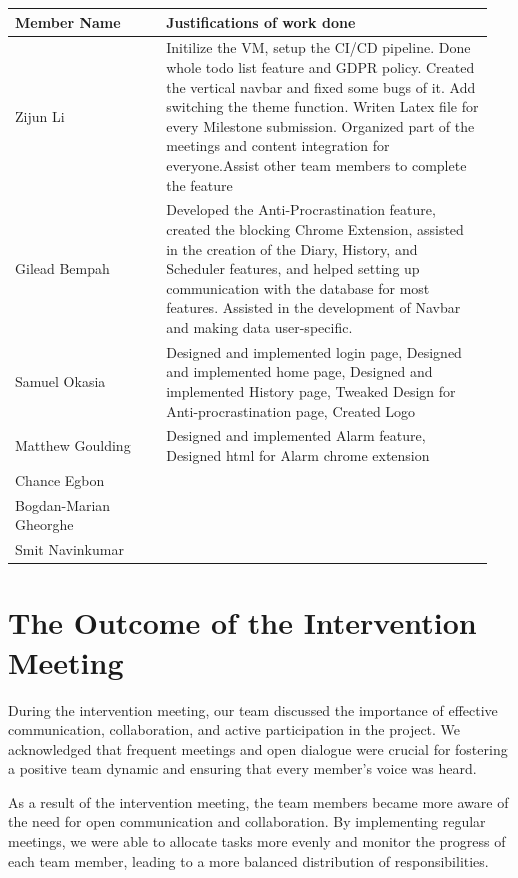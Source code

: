 \documentclass[a4paper]{article}
\begin{document}
{\noindent\begin{tabular}{|p{0.3\linewidth}|p{0.65\linewidth}|} 
	\hline
 \textbf{Member Name} & \textbf{Justifications of work done} \\
 \hline
 Zijun Li & Initilize the VM, setup the CI/CD pipeline. Done whole todo list feature and GDPR policy. Created the vertical navbar and fixed some bugs of it. Add switching the theme function. Writen Latex file for every Milestone submission. Organized part of the meetings and content integration for everyone.Assist other team members to complete the feature \\
 \hline
 Gilead Bempah & Developed the Anti-Procrastination feature, created the blocking Chrome Extension, assisted in the creation of the Diary, History, and Scheduler features, and helped setting up communication with the database for most features. Assisted in the development of Navbar and making data user-specific.\\
 \hline
 Samuel Okasia & Designed and implemented login page, Designed and implemented home page, Designed and implemented History page, Tweaked Design for Anti-procrastination page, Created Logo\\
 \hline
 Matthew Goulding& Designed and implemented Alarm feature, Designed html for Alarm chrome extension\\
 \hline
 Chance Egbon & \\
 \hline
 Bogdan-Marian Gheorghe & \\
 \hline
 Smit Navinkumar& \\
 \hline
\end{tabular}}

\newpage

\section*{The Outcome of the Intervention Meeting}

During the intervention meeting, our team discussed the importance of effective communication, collaboration, and active participation in the project. We acknowledged that frequent meetings and open dialogue were crucial for fostering a positive team dynamic and ensuring that every member's voice was heard.

As a result of the intervention meeting, the team members became more aware of the need for open communication and collaboration. By implementing regular meetings, we were able to allocate tasks more evenly and monitor the progress of each team member, leading to a more balanced distribution of responsibilities.
\end{document}

